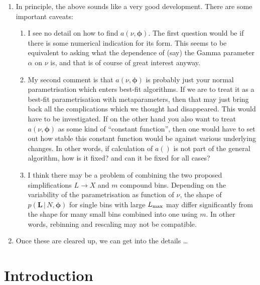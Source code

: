 \documentclass[11pt]{article}
\newcommand{\cond}{\,|\,}
\newcommand{\bmL}{{\bm{L}}}
\newcommand{\bmphi}{{\bm{\phi}}}
\newcommand{\Lmax}{L_{\rm max}}
\begin{document}
{\begin{enumerate}
  \item In principle, the above sounds like a very good development.
    There are some important caveats:
    \begin{enumerate}
    \item I see no detail on how to find $a(\nu,\bmphi)$. The first
      question would be if there is some numerical indication for its
      form. This seems to be equivalent to asking what the dependence
      of (say) the Gamma parameter $\alpha$ on $\nu$ is, and that is
      of course of great interest anyway.

    \item My second comment is that $a(\nu,\bmphi)$ is probably just
      your normal parametrisation which enters best-fit algorithms.
      If we are to treat it as a best-fit parametrisation with
      metaparameters, then that may just bring back all the
      complications which we thought had disappeared. This would have
      to be investigated. If on the other hand you also want to
      treat $a(\nu,\bmphi)$ as some kind of ``constant function'',
      then one would have to set out how stable this constant function
      would be against various underlying changes. In other words,
      if calculation of $a()$ is not part of the general algorithm,
      how is it fixed? and can it be fixed for all cases?

    \item I think there may be a problem of combining the two proposed
      simplifications $L \to X$ and $m$ compound bins. Depending on
      the variability of the parametrisation as function of $\nu$, the
      shape of $p(\bmL\cond N,\bmphi)$ for single bins with large
      $\Lmax$ may differ significantly from the shape for many small
      bins combined into one using $m$. In other words, rebinning
      and rescaling may not be compatible.
    \end{enumerate}

  \item Once these are cleared up, we can get into the details \ldots\\

  \end{enumerate}
} %


\section{Introduction}
\end{document}

